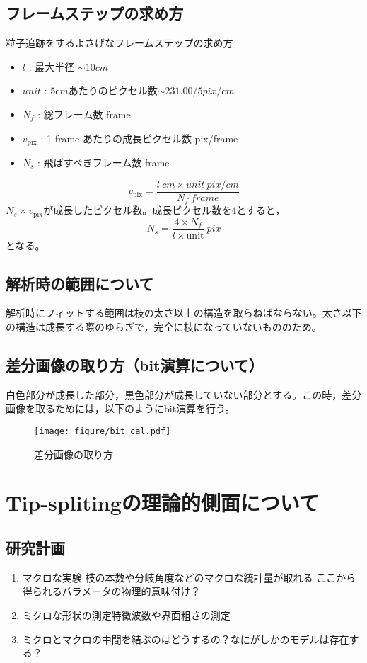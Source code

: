 \documentclass{ltjsarticle}
\begin{document}
\subsection{フレームステップの求め方}
粒子追跡をするよさげなフレームステップの求め方
\begin{itemize}
  \item $l$ : 最大半径 $\sim 10 \si{cm}$
  \item $unit$ : $5\si{cm}$あたりのピクセル数$\sim231.00/5 \si{pix/cm}$
  \item $N_f$ : 総フレーム数 frame
  \item $v_\mathrm{pix}$ : 1 frame あたりの成長ピクセル数 pix/frame
  \item $N_s$ : 飛ばすべきフレーム数 frame
\end{itemize}
\begin{equation}
  v_\mathrm{pix}=\frac{l ~\si{cm}\times unit ~\si{pix/cm}}{N_f ~\si{frame}}
\end{equation}
$N_s\times v_\mathrm{pix}$が成長したピクセル数。成長ピクセル数を4とすると，
\begin{equation}
  N_s= \frac{4\times N_f}{l \times \mathrm{unit}} ~\si{pix}
\end{equation}
となる。
\subsection{解析時の範囲について}
解析時にフィットする範囲は枝の太さ以上の構造を取らねばならない。太さ以下の構造は成長する際のゆらぎで，完全に枝になっていないもののため。
\subsection{差分画像の取り方（bit演算について）}
白色部分が成長した部分，黒色部分が成長していない部分とする。この時，差分画像を取るためには，以下のようにbit演算を行う。
\begin{figure}[H]
  \centering
  \texttt{[image: figure/bit\_cal.pdf]}
  \caption{差分画像の取り方}
  \label{fig:bit_cal}
\end{figure}

\section{Tip-splitingの理論的側面について}
\subsection{研究計画}
\begin{enumerate}
  \item マクロな実験 \rightarrow 枝の本数や分岐角度などのマクロな統計量が取れる \rightarrow ここから得られるパラメータの物理的意味付け？
  \item ミクロな形状の測定\cite{schilardi2000stable}\rightarrow 特徴波数や界面粗さの測定
  \item ミクロとマクロの中間を結ぶのはどうするの？\rightarrow なにがしかのモデルは存在する？
\end{enumerate}


\end{document}

